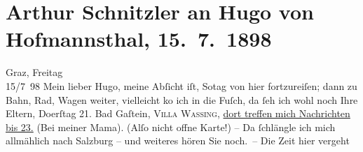 

         
         \renewcommand{\erwaehntePersonen}{Personen: Richard Beer-Hofmann, Hugo von Hofmannsthal, Hugo August von Hofmannsthal, Anna von Hofmannsthal, Louise Schnitzler}
         \renewcommand{\erwaehnteOrte}{Orte: Bad Fusch, Bad Gastein, Graz, Salzburg, Tschortkiw, Villa Dr. Wassing, Wien}
         \renewcommand{\erwaehnteWerke}{Werke: Der Schleier der Beatrice. Schauspiel in fünf Akten, Der Sohn. Aus den Papieren eines Arztes, Therese. Chronik eines Frauenlebens}
               \section[Arthur Schnitzler an Hugo von Hofmannsthal, 15. 7. 1898]{ Arthur Schnitzler an Hugo von Hofmannsthal, 15. 7. 1898}\nopagebreak{}\rehead{ }\begin{ledgroupsized}[t]{13cm}\normalsize\beginnumbering \toendnotes[C]{\smallbreak\pagebreak[2]} 
\toendnotes[C]{\smallbreak}\pstart
           \raggedleft{}{\pb}Graz, Freitag{\\}15/7 98\pend
           \pstart
           Mein lieber Hugo, meine Abſicht iſt, So{\geminationn}tag von hier fortzureiſen; dann zu Bahn, Rad,
               Wagen weiter, vielleicht ko{\geminationm} ich in die Fuſch, da ſeh ich wohl noch Ihre Eltern, Do{\geminationn}erſtag 21.{ }\introOben{}Bad\introOben{} Gaſtein, \textsc{Villa Wassing}, \uline{dort treffen mich Nachrichten bis 23.} (Bei meiner Mama).
                  \introOben{}(Alſo nicht offne Karte!)\introOben{} – Da{\geminationn}{ }ſchlängle ich mich allmählich nach Salzburg – und weiteres hören Sie noch. – Die Zeit hier vergeht

\end{ledgroupsized}
